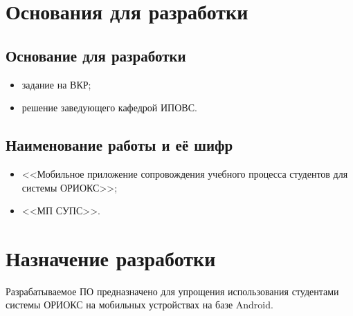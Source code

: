 \vspace{0.75cm}
\chapter{Основания для разработки}
\label{ch:reasons}

\section{Основание для разработки}
\label{sec:reasons}

\begin{itemize}
  \item задание на ВКР;
  \item решение заведующего кафедрой ИПОВС.
\end{itemize}

\section{Наименование работы и её шифр}
\label{sec:naming}

\begin{itemize}
  \item <<Мобильное приложение сопровождения учебного процесса студентов для системы ОРИОКС>>;
  \item <<МП СУПС>>.
\end{itemize}

\vspace{0.75cm}
\chapter{Назначение разработки}
\label{ch:target}

Разрабатываемое ПО предназначено для упрощения использования студентами системы ОРИОКС на мобильных устройствах на базе Android.
